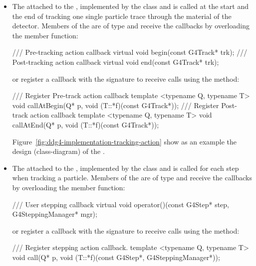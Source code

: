\begin{itemize}
\item The  attached to the , 
    implemented by the   class 
    and is called at the start and the end of tracking one single particle 
    trace through the material of the detector.
    Members of the  are of type
     and receive the callbacks by overloading the member function:
\begin{unnumberedcode}
/// Pre-tracking action callback
virtual void begin(const G4Track* trk);
/// Post-tracking action callback
virtual void end(const G4Track* trk);
\end{unnumberedcode}
    or register a callback with the signature {}
    to receive calls using the method:
\begin{unnumberedcode}
/// Register Pre-track action callback
template <typename Q, typename T> void callAtBegin(Q* p, void (T::*f)(const G4Track*));
/// Register Post-track action callback
template <typename Q, typename T> void callAtEnd(Q* p, void (T::*f)(const G4Track*));
\end{unnumberedcode}
Figure~\ref{fig:ddg4-implementation-tracking-action} show as an example 
the design (class-diagram) of the .


\item The  attached to the , implemented 
    by the   class and is called for each
    step when tracking a particle.
    Members of the  are of type
     and receive the callbacks by overloading the member function:
\begin{unnumberedcode}
/// User stepping callback
virtual void operator()(const G4Step* step, G4SteppingManager* mgr);
\end{unnumberedcode}
    or register a callback with the signature {}
    to receive calls using the method:
\begin{unnumberedcode}
/// Register stepping action callback.
template <typename Q, typename T> void call(Q* p, void (T::*f)(const G4Step*, 
                                                               G4SteppingManager*));
\end{unnumberedcode}



\end{itemize}
